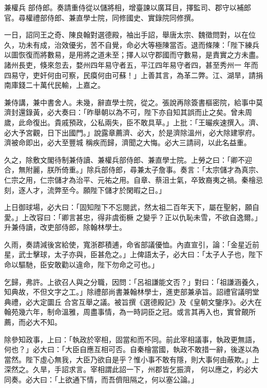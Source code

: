 \begin{pinyinscope}
 兼權兵
 部侍郎。奏請重侍從以儲將相，增臺諫以廣耳目，擇監司、郡守以補郎官。尋權禮部侍郎、兼直學士院，同修國史、實錄院同修撰。



 一日，詔同王之奇、陳良翰對選德殿，袖出手詔，舉唐太宗、魏徵問對，以在位久，功未有成，治效優劣，苦不自覺，命必大等極陳當否。退而條陳：「陛下練兵以圖恢復而將數易，是用將之道未至；擇人以守郡國而守數易，是責實之方未盡。諸州長吏，倏來忽去，婺州四年易守者五，平江四年易守者四，甚至秀州一
 年而四易守，吏奸何由可察，民瘼何由可蘇！」上善其言，為革二弊。江、湖旱，請捐南庫錢二十萬代民輸，上嘉之。



 兼侍講，兼中書舍人。未幾，辭直學士院，從之。張說再除簽書樞密院，給事中莫濟封還錄黃，必大奏曰：「昨舉朝以為不可，陛下亦自知其誤而止之矣。曾未周歲，此命復出。貴戚預政，公私兩失，臣不敢具草。」上批：「王曮疾速撰入。濟、必大予宮觀，日下出國門。」說露章薦濟、必大，於是濟除溫州，必大除建寧府。濟被命即出，必大至豐城
 稱疾而歸，濟聞之大悔。必大三請祠，以此名益重。



 久之，除敷文閣待制兼侍讀、兼權兵部侍郎、兼直學士院。上勞之曰：「卿不迎合，無附麗，朕所倚重。」除兵部侍郎，尋兼太子詹事。奏言：「太宗儲才為真宗、仁宗之用，仁宗儲才為治平、元祐之用。自章、蔡沮士氣，卒致裔夷之禍。秦檜忌刻，逐人才，流弊至今。願陛下儲才於閑暇之日。」



 上日御球場，必大曰：「固知陛下不忘閱武，然太祖二百年天下，屬在聖躬，願自愛。」上改容曰：「卿言甚忠，得非虞銜橛
 之變乎？正以仇恥未雪，不欲自逸爾。」升兼侍讀，改吏部侍郎，除翰林學士。



 久雨，奏請減後宮給使，寬浙郡積逋，命省部議優恤。內直宣引，論：「金星近前星，武士擊球，太子亦與，臣甚危之。」上俾語太子，必大曰：「太子人子也，陛下命以驅馳，臣安敢勸以違命，陛下勿命之可也。」



 乞歸，弗許。上欲召人與之分職，因問：「呂祖謙能文否？」對曰：「祖謙涵養久，知典故，不但文字之工。」除禮部尚書兼翰林學士，進吏部兼承旨。詔禮官議明堂典禮，必大定圜丘
 合宮互舉之議。被旨撰《選德殿記》及《皇朝文鑒序》。必大在翰苑幾六年，制命溫雅，周盡事情，為一時詞臣之冠。或言其再入也，實曾覿所薦，而必大不知。



 除參知政事，上曰：「執政於宰相，固當和而不同。前此宰相議事，執政更無語，何也？」必大曰：「大臣自應互相可否。自秦檜當國，執政不敢措一辭，後遂以為當然。陛下虛心無我，大臣乃欲自是乎？惟小事不敢有隱，則大事何由蔽欺。」上深然之。久旱，手詔求言。宰相謂此詔一下，州郡皆乞振濟，
 何以應之，約必大同奏。必大曰：「上欲通下情，而吾儕阻隔之，何以塞公論。」




\end{pinyinscope}
